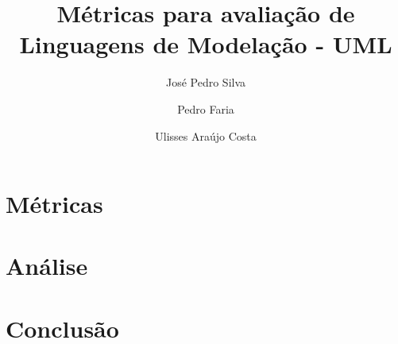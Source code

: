 \documentclass[10pt]{article}
\title{\sf  Métricas para avaliação de Linguagens de Modelação - UML}
\author{ José Pedro Silva \and Pedro Faria \and Ulisses Araújo Costa }
\date{}
\begin{document}
\maketitle

\section{Métricas}

\section{Análise}


\section{Conclusão}

{}

\end{document}
